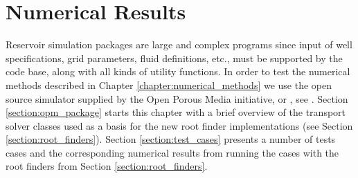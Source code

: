 \chapter{Numerical Results} \thispagestyle{chapterpage}
\label{chapter:numerical_results}

Reservoir simulation packages are large and complex programs since input of well specifications, grid parameters, fluid definitions, etc., must be supported by the code base, along with all kinds of utility functions. In order to test the numerical methods described in Chapter \ref{chapter:numerical_methods} we use the open source simulator supplied by the Open Porous Media initiative, or \opm, see \citet{opm_2014}. Section \ref{section:opm_package} starts this chapter with a brief overview of the \opm transport solver classes used as a basis for the new root finder implementations (see Section \ref{section:root_finders}). Section \ref{section:test_cases} presents a number of tests cases and the corresponding numerical results from running the cases with the root finders from Section \ref{section:root_finders}.

